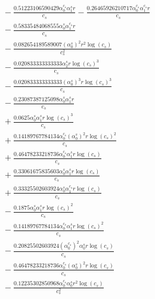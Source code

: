 \documentclass[10pt]{article}
\begin{document}
\begin{align*}
&{}  - \frac{0.51223106590429 \alpha_{0}^{c_s} \alpha_{1}^s r}{c_{s}} - \frac{0.26465926210717 \alpha_{0}^{c_s} \alpha_{1}^{c_s} r}{c_{s}} \\
&{}  - \frac{0.58335484068555 \alpha_{0}^s \alpha_{1}^{c_s} r}{c_{s}} \\
&{}  - \frac{0.082654189589007 \left(\alpha_{0}^s\right)^{2} r^{2} \log{\left(c_{s} \right)}}{c_{s}^{2}} \\
&{}  - \frac{0.020833333333333 \alpha_{2}^s r \log{\left(c_{s} \right)}^{3}}{c_{s}} \\
&{}  - \frac{0.020833333333333 \left(\alpha_{0}^s\right)^{3} r \log{\left(c_{s} \right)}^{3}}{c_{s}} \\
&{}  - \frac{0.23087387125098 \alpha_{0}^s \alpha_{1}^s r}{c_{s}} \\
&{}  + \frac{0.0625 \alpha_{0}^s \alpha_{1}^s r \log{\left(c_{s} \right)}^{3}}{c_{s}} \\
&{}  + \frac{0.14189767784134 \alpha_{0}^{c_s} \left(\alpha_{0}^s\right)^{2} r \log{\left(c_{s} \right)}^{2}}{c_{s}} \\
&{}  + \frac{0.46478233218736 \alpha_{0}^{c_s} \alpha_{1}^s r \log{\left(c_{s} \right)}}{c_{s}} \\
&{}  + \frac{0.33061675835603 \alpha_{0}^s \alpha_{1}^s r \log{\left(c_{s} \right)}}{c_{s}} \\
&{}  + \frac{0.33325502603924 \alpha_{0}^s \alpha_{1}^{c_s} r \log{\left(c_{s} \right)}}{c_{s}} \\
&{}  - \frac{0.1875 \alpha_{0}^s \alpha_{1}^s r \log{\left(c_{s} \right)}^{2}}{c_{s}} \\
&{}  - \frac{0.14189767784134 \alpha_{0}^{c_s} \alpha_{1}^s r \log{\left(c_{s} \right)}^{2}}{c_{s}} \\
&{}  - \frac{0.20825502603924 \left(\alpha_{0}^{c_s}\right)^{2} \alpha_{0}^s r \log{\left(c_{s} \right)}}{c_{s}} \\
&{}  - \frac{0.46478233218736 \alpha_{0}^{c_s} \left(\alpha_{0}^s\right)^{2} r \log{\left(c_{s} \right)}}{c_{s}} \\
&{}  - \frac{0.12235302850968 \alpha_{0}^{c_s} \alpha_{0}^s r^{2} \log{\left(c_{s} \right)}}{c_{s}^{2}}
\end{align*}
\end{document}
